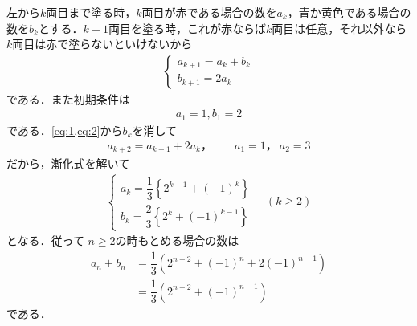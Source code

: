 \documentclass[../../main.tex]{subfiles}
\begin{document}
左から$k$両目まで塗る時，$k$両目が赤である場合の数を$a_k$，青か黄色である場合の数を$b_k$とする．$k+1$両目を塗る時，これが赤ならば$k$両目は任意，それ以外なら$k$両目は赤で塗らないといけないから
\begin{align}
  \begin{cases}
    a_{k+1}=a_k+b_k\\
    b_{k+1}=2a_k
  \end{cases} \label{eq:1}
\end{align}
である．また初期条件は
\begin{align}
  a_1=1, b_1=2 \label{eq:2}
\end{align}
である．\cref{eq:1,eq:2}から$b_k$を消して
\begin{align}
  a_{k+2}=a_{k+1}+2a_k，\qquad a_1=1，\ a_2=3 \label{eq:3}
\end{align}
だから，漸化式を解いて
\begin{align}
  \begin{cases}
    a_k=\dfrac{1}{3}\left\{2^{k+1}+(-1)^k\right\}\\
    b_k=\dfrac{2}{3}\left\{2^k+(-1)^{k-1}\right\}
  \end{cases} \quad(k\ge2) \label{eq:4}
\end{align}
となる．従って $n\ge2$の時もとめる場合の数は
\begin{align}
  a_n+b_n
  &=\dfrac{1}{3}\left(2^{n+2}+(-1)^n+2(-1)^{n-1}\right)\\
  &=\dfrac{1}{3}\left(2^{n+2}+(-1)^{n-1}\right)
\end{align}
である．

\newpage
\end{document}
